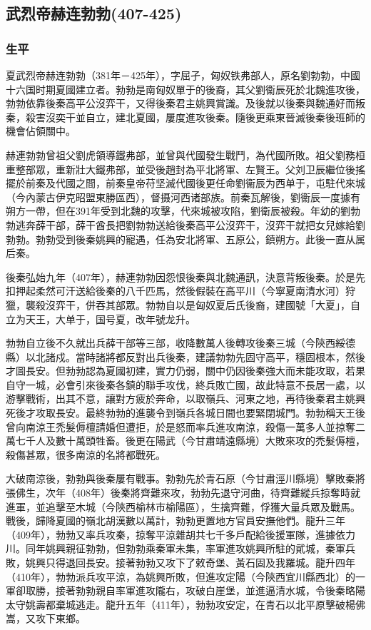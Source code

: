 
\subsection{武烈帝赫连勃勃\tiny(407-425)}

\subsubsection{生平}

夏武烈帝赫连勃勃（381年－425年），字屈孑，匈奴铁弗部人，原名劉勃勃，中國十六国时期夏國建立者。勃勃是南匈奴單于的後裔，其父劉衞辰死於北魏進攻後，勃勃依靠後秦高平公沒弈干，又得後秦君主姚興賞識。及後就以後秦與魏通好而叛秦，殺害沒奕干並自立，建北夏國，屢度進攻後秦。隨後更乘東晉滅後秦後班師的機會佔領關中。

赫連勃勃曾祖父劉虎領導鐵弗部，並曾與代國發生戰鬥，為代國所敗。祖父劉務桓重整部眾，重新壯大鐵弗部，並受後趙封為平北將軍、左賢王。父刘卫辰繼位後搖擺於前秦及代國之間，前秦皇帝苻坚滅代國後更任命劉衞辰为西单于，屯駐代來城（今內蒙古伊克昭盟東勝區西），督摄河西诸部族。前秦瓦解後，劉衞辰一度據有朔方一帶，但在391年受到北魏的攻擊，代來城被攻陷，劉衛辰被殺。年幼的劉勃勃逃奔薛干部，薛干酋長把劉勃勃送給後秦高平公沒弈干，沒弈干就把女兒嫁給劉勃勃。勃勃受到後秦姚興的寵遇，任為安北將軍、五原公，鎮朔方。此後一直从属后秦。

後秦弘始九年（407年），赫連勃勃因怨恨後秦與北魏通訊，決意背叛後秦。於是先扣押起柔然可汗送給後秦的八千匹馬，然後假裝在高平川（今寧夏南清水河）狩獵，襲殺沒弈干，併吞其部眾。勃勃自以是匈奴夏后氏後裔，建國號「大夏」，自立为天王，大单于，国号夏，改年號龙升。

勃勃自立後不久就出兵薛干部等三部，收降數萬人後轉攻後秦三城（今陝西綏德縣）以北諸戍。當時諸將都反對出兵後秦，建議勃勃先固守高平，穩固根本，然後才圖長安。但勃勃認為夏國初建，實力仍弱，關中仍因後秦強大而未能攻取，若果自守一城，必會引來後秦各鎮的聯手攻伐，終兵敗亡國，故此特意不長居一處，以游擊戰術，出其不意，讓對方疲於奔命，以取嶺兵、河東之地，再待後秦君主姚興死後才攻取長安。最終勃勃的進襲令到嶺兵各城日間也要緊閉城門。勃勃稱天王後曾向南涼王禿髮傉檀請婚但遭拒，於是怒而率兵進攻南涼，殺傷一萬多人並掠奪二萬七千人及數十萬頭牲畜。後更在陽武（今甘肅靖遠縣境）大敗來攻的禿髮傉檀，殺傷甚眾，很多南涼的名將都戰死。

大破南涼後，勃勃與後秦屢有戰事。勃勃先於青石原（今甘肅涇川縣境）擊敗秦將張佛生，次年（408年）後秦將齊難來攻，勃勃先退守河曲，待齊難縱兵掠奪時就進軍，並追擊至木城（今陝西榆林市榆陽區），生擒齊難，俘獲大量兵眾及戰馬。戰後，歸降夏國的嶺北胡漢數以萬計，勃勃更置地方官員安撫他們。龍升三年（409年），勃勃又率兵攻秦，掠奪平涼雜胡共七千多戶配給後援軍隊，進據依力川。同年姚興親征勃勃，但勃勃乘秦軍未集，率軍進攻姚興所駐的貮城，秦軍兵敗，姚興只得退回長安。接著勃勃又攻下了敕奇堡、黃石固及我羅城。龍升四年（410年），勃勃派兵攻平涼，為姚興所敗，但進攻定陽（今陝西宜川縣西北）的一軍卻取勝，接著勃勃親自率軍進攻隴右，攻破白崖堡，並進逼清水城，令後秦略陽太守姚壽都棄城逃走。龍升五年（411年），勃勃攻安定，在青石以北平原擊破楊佛嵩，又攻下東鄉。

